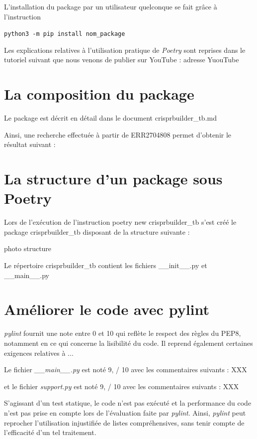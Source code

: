 \documentclass[twoside,a4paper,11pt,frenchb,openany]{report}
\begin{document}
L’installation du package par un utilisateur quelconque se fait grâce à l’instruction
\begin{tcolorbox}\texttt{python3 -m pip install nom\_package}\end{tcolorbox}

Les explications relatives à l’utilisation pratique de \textit{Poetry} sont reprises dans le tutoriel suivant que nous venons de publier sur YouTube : adresse YuouTube




	
	\section{La composition du package}

Le package est décrit en détail dans le document crisprbuilder\_tb.md


Ainsi, une recherche effectuée à partir de ERR2704808 permet d'obtenir le résultat suivant :


\section{La structure d'un package sous Poetry}

Lors de l'exécution de l'instruction poetry new crisprbuilder\_tb s'est créé le package crisprbuilder\_tb disposant de la structure suivante :

photo structure

Le répertoire crisprbuilder\_tb contient les fichiers \_\_init\_\_.py et \_\_main\_\_.py


\section{Améliorer le code avec pylint}

\textit{pylint} fournit une note entre 0 et 10 qui reflète le respect des règles du PEP8, notamment en ce qui concerne la lisibilité du code. Il reprend également certaines exigences relatives à ...

Le fichier \textit{\_\_main\_\_.py} est noté 9, / 10 avec les commentaires suivants :
XXX

et le fichier \textit{support.py} est noté 9, / 10 avec les commentaires suivants :
XXX

S'agissant d'un test statique, le code n'est pas exécuté et la performance du code n'est pas prise en compte lors de l'évaluation faite par \textit{pylint}. Ainsi, \textit{pylint} peut reprocher l'utilisation injustifiée de listes compréhensives, sans tenir compte de l'efficacité d'un tel traitement.
\end{document}
